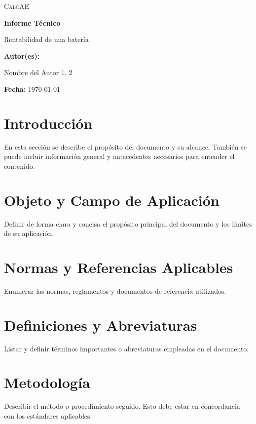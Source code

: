 \documentclass[a4paper,12pt]{article}
\let\OldTextField\TextField
\renewcommand{\TextField}[2][]{%
  \raisebox{-0.1ex}{\OldTextField[height=.95em,  bordercolor={1 1 1}, backgroundcolor={1 1 1},#1]{#2}}%
}
\begin{document}
\begin{Form}


\begin{titlepage}
    \centering
    {\scshape\LARGE CalcAE \par}
    \vspace{1cm}
    {\Huge\bfseries Informe Técnico\par}
    \vspace{2cm}
    {\Large Rentabilidad de una batería \par}
    \vspace{1cm}
    \vfill
    \textbf{Autor(es):}\par
    Nombre del Autor 1,\TextField[name=Tecnico,width=4cm,default=Juan Pérez]{} 2\par
    \vspace{0.5cm}
    \textbf{Fecha:} \today \par
\end{titlepage}

\tableofcontents
\newpage

\section{Introducción}
En esta sección se describe el propósito del documento y su alcance. También se puede incluir información general y antecedentes necesarios para entender el contenido.

\section{Objeto y Campo de Aplicación}
Definir de forma clara y concisa el propósito principal del documento y los límites de su aplicación.

\section{Normas y Referencias Aplicables}
Enumerar las normas, reglamentos y documentos de referencia utilizados.

\section{Definiciones y Abreviaturas}
Listar y definir términos importantes o abreviaturas empleadas en el documento.

\section{Metodología}
Describir el método o procedimiento seguido. Esto debe estar en concordancia con los estándares aplicables.


\end{Form}
\end{document}
